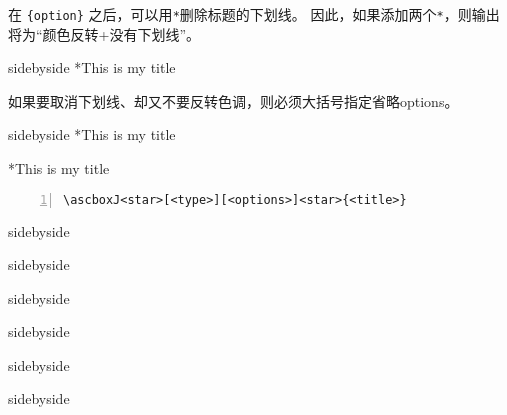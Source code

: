 在 \verb|{option}| 之后，可以用\verb|*|删除标题的下划线。 因此，如果添加两个\verb|*|，则输出将为“颜色反转+没有下划线”。

\begin{tcblisting}{sidebyside}
    \ascboxB**{This is my title} 
\end{tcblisting}

如果要取消下划线、却又不要反转色调，则必须大括号指定省略options。
\begin{tcblisting}{sidebyside}
    \ascboxB[A][]*{This is my title}
    
    \ascboxB*[C][]*{This is my title}
\end{tcblisting}


\begin{lstlisting}[backgroundcolor=\color{gray!5},framerule=1pt,frame=tb,numbers=left,
    numberstyle=\tiny\color{black},]
\ascboxJ<star>[<type>][<options>]<star>{<title>}
\end{lstlisting}


\begin{tcblisting}{sidebyside}
    
\end{tcblisting}

\begin{tcblisting}{sidebyside}
    
\end{tcblisting}



\begin{tcblisting}{sidebyside}
    
\end{tcblisting}

\begin{tcblisting}{sidebyside}
    
\end{tcblisting}


\begin{tcblisting}{sidebyside}
    
\end{tcblisting}

\begin{tcblisting}{sidebyside}
    
\end{tcblisting}

